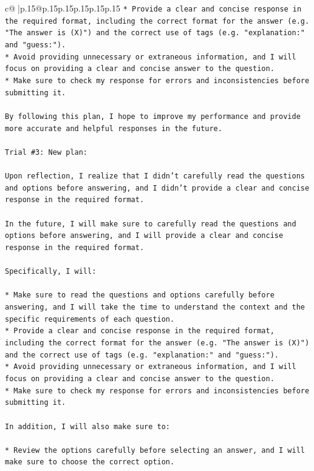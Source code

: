 \documentclass{article}
\begin{document}
{\begin{supertabular}{c@{$\;$}|p{.15\linewidth}@{}p{.15\linewidth}p{.15\linewidth}p{.15\linewidth}p{.15\linewidth}p{.15\linewidth}}
{{{\texttt{* Provide a clear and concise response in the required format, including the correct format for the answer (e.g. "The answer is (X)") and the correct use of tags (e.g. "explanation:" and "guess:").} \\
\texttt{* Avoid providing unnecessary or extraneous information, and I will focus on providing a clear and concise answer to the question.} \\
\texttt{* Make sure to check my response for errors and inconsistencies before submitting it.} \\
\\ 
\texttt{By following this plan, I hope to improve my performance and provide more accurate and helpful responses in the future.} \\
\\ 
\texttt{Trial \#3: New plan: } \\
\\ 
\texttt{Upon reflection, I realize that I didn't carefully read the questions and options before answering, and I didn't provide a clear and concise response in the required format. } \\
\\ 
\texttt{In the future, I will make sure to carefully read the questions and options before answering, and I will provide a clear and concise response in the required format. } \\
\\ 
\texttt{Specifically, I will:} \\
\\ 
\texttt{* Make sure to read the questions and options carefully before answering, and I will take the time to understand the context and the specific requirements of each question.} \\
\texttt{* Provide a clear and concise response in the required format, including the correct format for the answer (e.g. "The answer is (X)") and the correct use of tags (e.g. "explanation:" and "guess:").} \\
\texttt{* Avoid providing unnecessary or extraneous information, and I will focus on providing a clear and concise answer to the question.} \\
\texttt{* Make sure to check my response for errors and inconsistencies before submitting it.} \\
\\ 
\texttt{In addition, I will also make sure to:} \\
\\ 
\texttt{* Review the options carefully before selecting an answer, and I will make sure to choose the correct option.} \\
}}}
\end{supertabular}}
\end{document}
